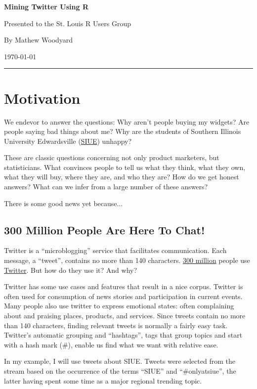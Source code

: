 \documentclass[letterpaper, 12pt]{article}
\begin{document}
\begin{center}
\huge{\bf{Mining Twitter Using R}}

\normalsize{Presented to the St. Louis R Users Group}

\normalsize{By Mathew Woodyard}

\normalsize{\today}
\end{center}
\hrule


\section{Motivation}
We endevor to answer the questions: Why aren't people buying my widgets? Are people saying bad things about me? Why are the students of Southern Illinois University Edwardsville (\href{http://www.siue.edu/}{SIUE}) unhappy?

These are classic questions concerning not only product marketers, but statisticians. What convinces people to tell us what they think, what they own, what they will buy, where they are, and who they are? How do we get honest answers? What can we infer from a large number of these answers?

There is some good news yet because...

\subsection{300 Million People Are Here To Chat!}
Twitter is a ``microblogging'' service that facilitates communication. Each message, a ``tweet'', contains no more than 140 characters. \href{http://www.wolframalpha.com/input/?i=number%20of%20Twitter%20users}{300 million} people use \href{http://Twitter.com}{Twitter}. But how do they use it? And why? 

Twitter has some use cases and features that result in a nice corpus. Twitter is often used for consumption of news stories and participation in current events. Many people also use twitter to express emotional states: often complaining about and praising places, products, and services. Since tweets contain no more than 140 characters, finding relevant tweets is normally a fairly easy task. Twitter's automatic grouping and ``hashtags'', tags that group topics and start with a hash mark (\#), enable us find what we want with relative ease.

In my example, I will use tweets about SIUE. Tweets were selected from the stream based on the occurrence of the terms ``SIUE'' and ``\#onlyatsiue'', the latter having spent some time as a major regional trending topic.
\end{document}
